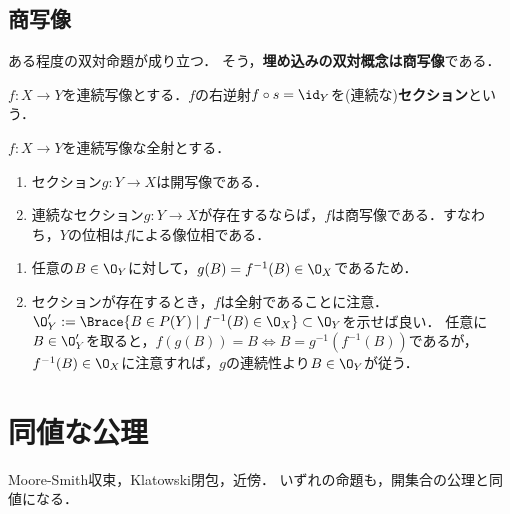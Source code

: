\documentclass[uplatex,dvipdfmx]{jsreport}
\begin{document}
\subsection{商写像}

\begin{tcolorbox}[colframe=ForestGreen, colback=ForestGreen!10!white,breakable,colbacktitle=ForestGreen!40!white,coltitle=black,fonttitle=\bfseries\sffamily,
title=]
    ある程度の双対命題が成り立つ．
    そう，\textbf{埋め込みの双対概念は商写像}である．
\end{tcolorbox}

\begin{definition}
    $f:X\to Y$を連続写像とする．$f$の右逆射$f\circ s=\id_Y$を(連続な)\textbf{セクション}という．
\end{definition}

\begin{proposition}[商写像の十分条件]
    $f:X\to Y$を連続写像な全射とする．
    \begin{enumerate}
        \item セクション$g:Y\to X$は開写像である．
        \item 連続なセクション$g:Y\to X$が存在するならば，$f$は商写像である．すなわち，$Y$の位相は$f$による像位相である．
    \end{enumerate}
\end{proposition}
\begin{Proof}\mbox{}
    \begin{enumerate}
        \item 任意の$B\in\O_Y$に対して，$g(B)=f^{-1}(B)\in\O_X$であるため．
        \item セクションが存在するとき，$f$は全射であることに注意．
        $\O_Y':=\Brace{B\in P(Y)\mid f^{-1}(B)\in\O_X}\subset\O_Y$を示せば良い．
        任意に$B\in\O_Y'$を取ると，$f(g(B))=B\Leftrightarrow B=g^{-1}(f^{-1}(B))$であるが，$f^{-1}(B)\in\O_X$に注意すれば，$g$の連続性より$B\in\O_Y$が従う．
    \end{enumerate}
\end{Proof}

\section{同値な公理}

\begin{tcolorbox}[colframe=ForestGreen, colback=ForestGreen!10!white,breakable,colbacktitle=ForestGreen!40!white,coltitle=black,fonttitle=\bfseries\sffamily,
    title=]
    Moore-Smith収束，Klatowski閉包，近傍．
    いずれの命題も，開集合の公理と同値になる．
\end{tcolorbox}
\end{document}
